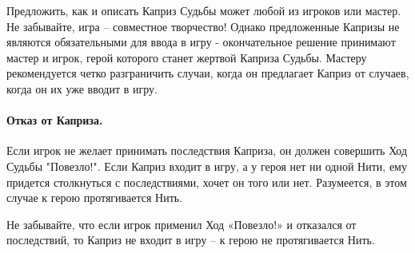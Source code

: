 \begin{tcolorbox}
Предложить, как и описать Каприз Судьбы может любой из игроков или мастер. Не забывайте, игра – совместное творчество! Однако предложенные Капризы не являются обязательными для ввода в игру - окончательное решение принимают мастер и игрок, герой которого станет жертвой Каприза Судьбы.
\newline Мастеру рекомендуется четко разграничить случаи, когда он предлагает Каприз от случаев, когда он их уже вводит в игру.
\end{tcolorbox}
\paragraph{Отказ от Каприза.} Если игрок не желает принимать последствия Каприза, он должен совершить Ход Судьбы "Повезло!". Если Каприз входит в игру, а у героя нет ни одной Нити, ему придется столкнуться с последствиями, хочет он того или нет. Разумеется, в этом случае к герою протягивается Нить.
\begin{tcolorbox}
Не забывайте, что если игрок применил Ход «Повезло!» и отказался от последствий, то Каприз не входит в игру – к герою не протягивается Нить.
\end{tcolorbox}
